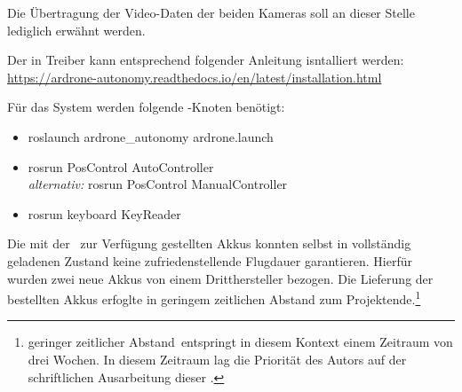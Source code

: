 Die Übertragung der Video-Daten der beiden Kameras soll an dieser Stelle lediglich erwähnt werden.




















Der in  Treiber kann entsprechend folgender Anleitung isntalliert werden:\\
\href{https://ardrone-autonomy.readthedocs.io/en/latest/installation.html}{https://ardrone-autonomy.readthedocs.io/en/latest/installation.html}

Für das System werden folgende \ROS-Knoten benötigt:
\begin{itemize}
\item roslaunch ardrone\_autonomy ardrone.launch
\item rosrun PosControl AutoController\\
\textit{alternativ:} rosrun PosControl ManualController
\item rosrun keyboard KeyReader
\end{itemize}



Die mit der \Ar\ zur Verfügung gestellten Akkus konnten selbst in vollständig geladenen Zustand keine zufriedenstellende Flugdauer garantieren. Hierfür wurden zwei neue Akkus von einem Dritthersteller bezogen. Die Lieferung der bestellten Akkus erfoglte in geringem zeitlichen Abstand zum Projektende.\footnote{\glqq geringer zeitlicher Abstand\grqq\ entspringt in diesem Kontext einem Zeitraum von drei Wochen. In diesem Zeitraum lag die Priorität des Autors auf der schriftlichen Ausarbeitung dieser \Arbeit.}




















